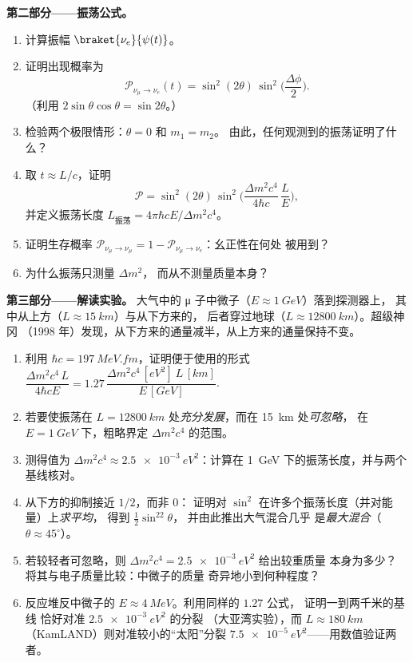 \begin{problem}
\medskip\noindent\textbf{第二部分——振荡公式。}
\begin{enumerate}[resume]
  \item 计算振幅 $\braket{\nu_e}{\psi(t)}$。
  \item 证明出现概率为
        \[
        \mathcal P_{\nu_\mu \to \nu_e}(t) =
        \sin^2(2\theta)\,\sin^2\Big(\frac{\Delta\phi}{2}\Big) .
        \]
        （利用 $2\sin\theta\cos\theta = \sin2\theta$。）
  \item 检验两个极限情形：$\theta = 0$ 和 $m_1 = m_2$。
        由此，任何观测到的振荡证明了什么？
  \item 取 $t \approx L/c$，证明
        \[
        \mathcal P = \sin^2(2\theta)\,
        \sin^2\Big(\frac{\Delta m^2c^4}{4\hbar c}\,\frac{L}{E}\Big) ,
        \]
        并定义振荡长度 $L_{\text{振荡}} =
        4\pi\hbar cE/\Delta m^2c^4$。
  \item 证明生存概率 $\mathcal P_{\nu_\mu \to
        \nu_\mu} = 1 - \mathcal P_{\nu_\mu\to\nu_e}$：幺正性在何处
        被用到？
  \item 为什么振荡只测量 $\Delta m^2$，
        而从不测量质量本身？
\end{enumerate}

\medskip\noindent\textbf{第三部分——解读实验。}
大气中的 μ 子中微子（$E \approx \qty{1}{GeV}$）落到探测器上，
其中从上方（$L \approx \qty{15}{km}$）与从下方来的，
后者穿过地球（$L \approx \qty{12800}{km}$）。超级神冈
（1998 年）发现，从下方来的通量减半，从上方来的通量保持不变。
\begin{enumerate}[resume]
  \item 利用 $\hbar c = \qty{197}{MeV.fm}$，证明便于使用的形式
        $\dfrac{\Delta m^2c^4\,L}{4\hbar cE} = 1.27\,
        \dfrac{\Delta m^2c^4\,[\unit{eV^2}]\ L\,[\unit{km}]}
        {E\,[\unit{GeV}]}$.
  \item 若要使振荡在 $L =
        \qty{12800}{km}$ 处\emph{充分发展}，而在 \qty{15}{km} 处\emph{可忽略}，
        在 $E = \qty{1}{GeV}$ 下，粗略界定 $\Delta m^2c^4$ 的范围。
  \item 测得值为 $\Delta m^2c^4 \approx
        \qty{2.5e-3}{eV^2}$：计算在
        \qty{1}{GeV} 下的振荡长度，并与两个基线核对。
  \item 从下方的抑制接近 $1/2$，而非 $0$：
        证明对 $\sin^2$ 在许多个振荡长度（并对能量）上\emph{求平均}，
        得到 $\tfrac12\sin^22\theta$，
        并由此推出大气混合几乎
        是\emph{最大混合}（$\theta \approx 45^\circ$）。
  \item 若较轻者可忽略，则 $\Delta m^2c^4 = \qty{2.5e-3}{eV^2}$ 给出较重质量
        本身为多少？
        将其与电子质量比较：中微子的质量
        奇异地小到何种程度？
  \item 反应堆反中微子的 $E \approx \qty{4}{MeV}$。利用同样的 $1.27$ 公式，
        证明一到两千米的基线
        恰好对准 $\qty{2.5e-3}{eV^2}$ 的分裂
        （大亚湾实验），而 $L \approx \qty{180}{km}$
        （KamLAND）则对准较小的“太阳”分裂
        $\qty{7.5e-5}{eV^2}$——用数值验证两者。
\end{enumerate}


\end{problem}
